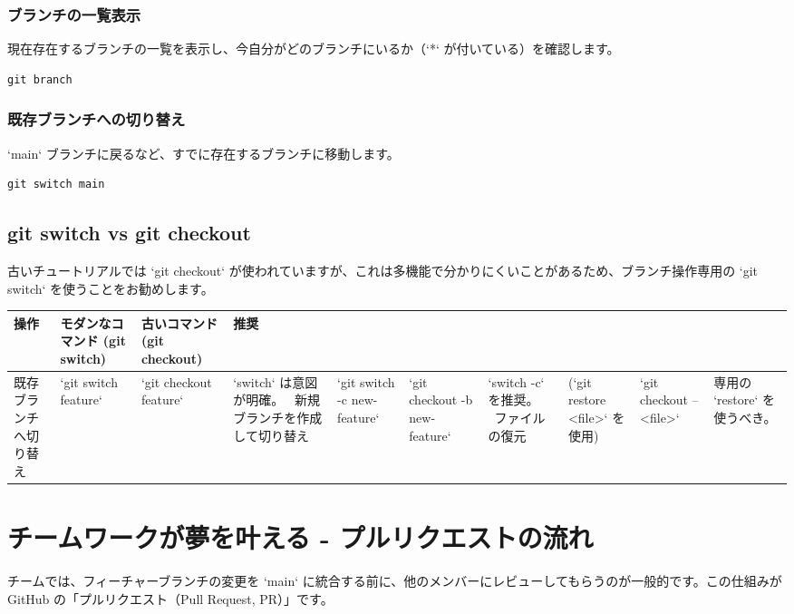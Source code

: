 \documentclass{ltjsarticle}
\begin{document}
\subsubsection{ブランチの一覧表示}
現在存在するブランチの一覧を表示し、今自分がどのブランチにいるか（`*` が付いている）を確認します。
\begin{verbatim}
git branch
\end{verbatim}

\subsubsection{既存ブランチへの切り替え}
`main` ブランチに戻るなど、すでに存在するブランチに移動します。
\begin{verbatim}
git switch main
\end{verbatim}

\subsection{git switch vs git checkout}
古いチュートリアルでは `git checkout` が使われていますが、これは多機能で分かりにくいことがあるため、ブランチ操作専用の `git switch` を使うことをお勧めします。
\begin{tabularx}{\textwidth}{|l|l|l|X|}
\hline
操作 & モダンなコマンド (git switch) & 古いコマンド (git checkout) & 推奨 \\ 
\hline
既存ブランチへ切り替え & `git switch feature` & `git checkout feature` & `switch` は意図が明確。 \ 
新規ブランチを作成して切り替え & `git switch -c new-feature` & `git checkout -b new-feature` & `switch -c` を推奨。 \ 
ファイルの復元 & (`git restore <file>` を使用) & `git checkout -- <file>` & 専用の `restore` を使うべき。 \ 
\hline
\end{tabularx}

\section{チームワークが夢を叶える - プルリクエストの流れ}
チームでは、フィーチャーブランチの変更を `main` に統合する前に、他のメンバーにレビューしてもらうのが一般的です。この仕組みがGitHub
の「プルリクエスト（Pull Request, PR）」です。
\end{document}
